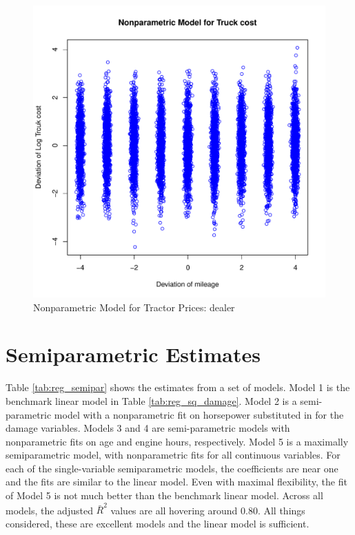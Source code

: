 \documentclass[11pt]{paper}
\begin{document}
\begin{figure}[h!]
  \centering
  \includegraphics[scale = 0.5, keepaspectratio=true]{../Figures/dev_np_vs_eng_dev}
  \caption{Nonparametric Model for Tractor Prices: dealer} \label{fig:dev_np_vs_eng_dev}
\end{figure}

 

\pagebreak
\section{Semiparametric Estimates}


Table \ref{tab:reg_semipar} 
shows the estimates from a set of models. 
Model 1 is the benchmark linear model in 
Table \ref{tab:reg_sq_damage}. 
Model 2 is a semi-parametric model
with a nonparametric fit on horsepower
substituted in for the damage variables.
Models 3 and 4 are semi-parametric models
with nonparametric fits on age and engine hours, respectively.
Model 5 is a maximally semiparametric model, 
with nonparametric fits for all continuous variables. 
For each of the single-variable semiparametric models, 
the coefficients are near one
and the fits are similar to the linear model. 
Even with maximal flexibility, the fit of Model 5
is not much better than the benchmark linear model. 
Across all models, the adjusted $\bar{R}^2$ values are all hovering around 0.80. 
All things considered, these are excellent models
and the linear model is sufficient.
\end{document}

